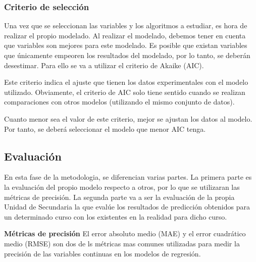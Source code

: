 \subsubsection{Criterio de selección}

Una vez que se seleccionan las variables y los algoritmos a estudiar, es hora de realizar el propio modelado. Al realizar el modelado, debemos tener en cuenta que variables son mejores para este modelado. Es posible que existan variables que únicamente empeoren los resultados del modelado, por lo tanto, se deberán desestimar. Para ello se va a utilizar el criterio de Akaike (AIC). 

Este criterio indica el ajuste que tienen los datos experimentales con el modelo utilizado. Obviamente, el criterio de AIC solo tiene sentido cuando se realizan comparaciones con otros modelos (utilizando el mismo conjunto de datos). \cite{martinez2009criterio}

Cuanto menor sea el valor de este criterio, mejor se ajustan los datos al modelo. Por tanto, se deberá seleccionar el modelo que menor AIC tenga. \cite{martinez2009criterio}

\subsection{Evaluación}
En esta fase de la metodologia, se diferencian varias partes. La primera parte es la evaluación del propio modelo respecto a otros, por lo que se utilizaran las métricas de precisión. La segunda parte va a ser la evaluación de la propia Unidad de Secundaria la que evalúe los resultados de predicción obtenidos para un determinado curso con los existentes en la realidad para dicho curso.

\textbf{Métricas de precisión}
El error absoluto medio (MAE) y el error cuadrático medio (RMSE) son dos de ls métricas mas comunes utilizadas para medir la precisión de las variables continuas en los modelos de regresión.

